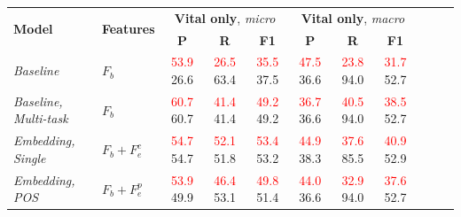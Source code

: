 \documentclass{article}
\newcommand{\sub}[1]{\textcolor{red}{#1}}
\begin{document}
\begin{table}[tb]
{\small
\begin{center}
\begin{tabular}{llccccccccc} 
\toprule
  \multirow{2}{*}{\textbf{Model}} & 
  \multirow{2}{*}{\textbf{Features}} & 
  \multicolumn{3}{c}{\textbf{Vital only}, \emph{micro}} &
  \multicolumn{3}{c}{\textbf{Vital only}, \emph{macro}}
\\ 
  \cmidrule(lr){3-5}
  \cmidrule(lr){6-8}
&   & 
  \textbf{P} & \textbf{R} & \textbf{F1} & 
  \textbf{P} & \textbf{R} & \textbf{F1} \\ 
\midrule
{\textit{Baseline}} & $F_b$ &
  \sub{53.9}  \hspace{1mm} 26.6 & \sub{26.5} \hspace{1mm} 63.4 & \sub{35.5} \hspace{1mm} 37.5 &
  \sub{47.5}  \hspace{1mm} 36.6 & \sub{23.8} \hspace{1mm} 94.0 & \sub{31.7} \hspace{1mm} 52.7 \\
{\textit{Baseline, Multi-task}} & $F_b$ &
  \sub{60.7} \hspace{1mm} 60.7 & \sub{41.4} \hspace{1mm} 41.4 & \sub{49.2} \hspace{1mm} 49.2 &
  \sub{36.7} \hspace{1mm} 36.6 & \sub{40.5} \hspace{1mm} 94.0 & \sub{38.5} \hspace{1mm} 52.7 \\
{\textit{Embedding, Single}} & $F_b+F_e^c$ & 
  \sub{54.7} \hspace{1mm} 54.7 & \sub{52.1} \hspace{1mm} 51.8 & \sub{53.4} \hspace{1mm} 53.2 &
  \sub{44.9} \hspace{1mm} 38.3 & \sub{37.6} \hspace{1mm} 85.5 & \sub{40.9} \hspace{1mm} 52.9 \\
{\textit{Embedding, POS}} & $F_b+F_e^p$ & 
  \sub{53.9} \hspace{1mm} 49.9 & \sub{46.4} \hspace{1mm} 53.1 & \sub{49.8} \hspace{1mm} 51.4 &
  \sub{44.0} \hspace{1mm} 36.6 & \sub{32.9} \hspace{1mm} 94.0 & \sub{37.6} \hspace{1mm} 52.7 \\

\end{tabular}
\end{center}}
\end{table}
\end{document}

